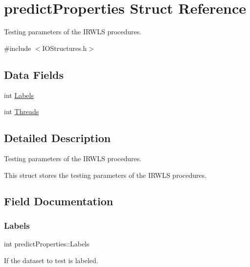\hypertarget{structpredictProperties}{}\section{predict\+Properties Struct Reference}
\label{structpredictProperties}


Testing parameters of the I\+R\+W\+LS procedures.  




{\ttfamily \#include $<$I\+O\+Structures.\+h$>$}

\subsection*{Data Fields}
\begin{DoxyCompactItemize}
\item 
int \hyperlink{structpredictProperties_a580276e3e15305d5ac16d9ce0eb9b20a}{Labels}
\item 
int \hyperlink{structpredictProperties_a602116e0d46424243cb4c971c03695e1}{Threads}
\end{DoxyCompactItemize}


\subsection{Detailed Description}
Testing parameters of the I\+R\+W\+LS procedures. 

This struct stores the testing parameters of the I\+R\+W\+LS procedures. 

\subsection{Field Documentation}
\hypertarget{structpredictProperties_a580276e3e15305d5ac16d9ce0eb9b20a}{}\label{structpredictProperties_a580276e3e15305d5ac16d9ce0eb9b20a} 
\subsubsection{\texorpdfstring{Labels}{Labels}}
{\ttfamily int predict\+Properties\+::\+Labels}

If the dataset to test is labeled. \hypertarget{structpredictProperties_a602116e0d46424243cb4c971c03695e1}{}\label{structpredictProperties_a602116e0d46424243cb4c971c03695e1} 
